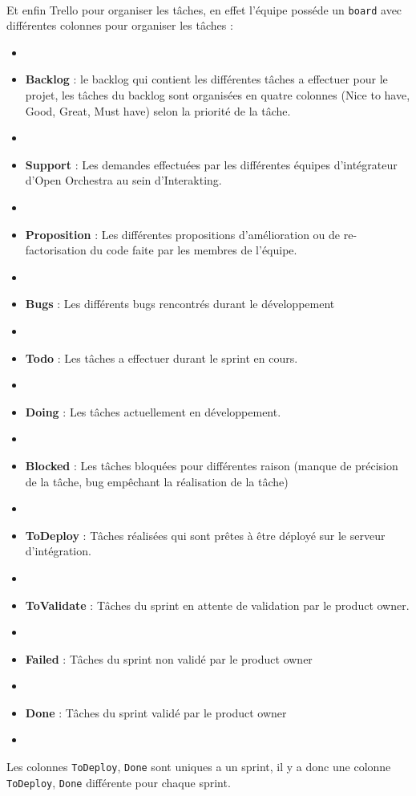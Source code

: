   \paragraph{}
 Et enfin Trello pour organiser les tâches, en effet l'équipe posséde un \verb?board? avec différentes colonnes pour organiser les tâches : 
 \begin{itemize}
 \item[]
 \item \textbf{Backlog} : le backlog qui contient les différentes tâches a effectuer pour le projet, les tâches du backlog sont organisées en quatre colonnes (Nice to have, Good, Great, Must have) selon la priorité de la tâche.
 \item[]
 \item \textbf{Support} : Les demandes effectuées par les différentes équipes d'intégrateur d'Open Orchestra au sein d'Interakting.
\item[]
 \item \textbf{Proposition} : Les différentes propositions d'amélioration ou de re-factorisation du code faite par les membres de l'équipe.
\item[]
 \item \textbf{Bugs} : Les différents bugs rencontrés durant le développement
\item[]
 \item \textbf{Todo} : Les tâches a effectuer durant le sprint en cours.
\item[]
 \item \textbf{Doing} : Les tâches actuellement en développement.
\item[]
 \item \textbf{Blocked} : Les tâches bloquées pour différentes raison (manque de précision de la tâche, bug empêchant la réalisation de la tâche)
\item[]
 \item \textbf{ToDeploy} : Tâches réalisées qui sont prêtes à être déployé sur le serveur d'intégration.
\item[]
 \item \textbf{ToValidate} : Tâches du sprint en attente de validation par le product owner.
\item[]
 \item \textbf{Failed} : Tâches du sprint non validé par le product owner
\item[]
 \item \textbf{Done} : Tâches du sprint validé par le product owner
 \item[]
 \end{itemize}
Les colonnes \verb?ToDeploy?, \verb?Done? sont uniques a un sprint, il y a donc une colonne \verb?ToDeploy?, \verb?Done? différente pour chaque sprint.
